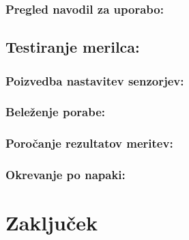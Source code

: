 \documentclass[12pt,a4paper,titlepage,openany]{report}
\begin{document}
\subsection{Pregled navodil za uporabo:}

\section{Testiranje merilca:}
\thispagestyle{fancy}


\subsection{Poizvedba nastavitev senzorjev:}
\subsection{Beleženje porabe:}
\subsection{Poročanje rezultatov meritev:}
\subsection{Okrevanje po napaki:}


\chapter{Zaključek}
\thispagestyle{fancy}











\end{document}
